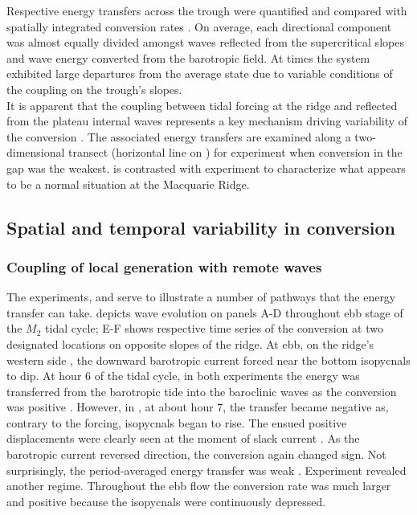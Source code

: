 \documentclass[12pt]{article}
\begin{document}
Respective energy transfers across the trough were quantified and compared with spatially 
integrated conversion rates . On average, each directional component 
was almost equally divided amongst waves reflected from the supercritical slopes and wave energy 
converted from the barotropic field. At times the system exhibited large departures from the 
average state due to variable conditions of the coupling on the trough's slopes.\\

It is apparent that the coupling between tidal forcing at the ridge and reflected 
from the plateau internal waves represents a key mechanism driving variability of the 
conversion . The associated energy transfers are examined along a 
two-dimensional transect (horizontal line on ) for 
experiment  when conversion in the gap was the weakest.  is contrasted with 
experiment  to characterize what appears to be a normal situation at the Macquarie 
Ridge.

\newpage
\subsection{Spatial and temporal variability in conversion}
\subsubsection{Coupling of local generation with remote waves}
\label{C3.sec:amp_mech}
The experiments,  and  serve to illustrate a number of pathways that the 
energy transfer can take.  depicts wave evolution on panels A-D throughout ebb 
stage of the $M_2$ tidal cycle; E-F shows respective time 
series of the conversion at two designated locations on opposite slopes of the ridge. At 
ebb, on the ridge's western side , the downward barotropic current 
forced near the bottom isopycnals to dip. At hour 6 of the tidal cycle, in both experiments the 
energy was 
transferred 
from 
the barotropic tide into the baroclinic waves as the conversion was positive 
. However, in , at about hour 7, the 
transfer became negative as, contrary to the forcing, isopycnals began to rise. The ensued  
positive displacements were clearly seen at the moment of slack current . 
As the 
barotropic current reversed direction, the conversion again changed sign. Not surprisingly, the 
period-averaged energy transfer was weak . Experiment  
revealed another regime. Throughout the ebb flow the conversion rate was much larger and positive 
because the isopycnals were continuously depressed.\\
\end{document}
